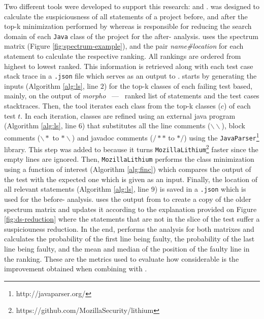 \documentclass[sigplan,10pt,review,anonymous]{acmart}\settopmatter{printfolios=true,printccs=false,printacmref=false}
\begin{document}
Two different tools were developed to support this research: \morpho{} and \lithium{}. \morpho{} was designed to calculate the suspiciousness of all statements of a project before, and after the top-k minimization performed by \lithium{} whereas \lithium{} is responsible for reducing the search domain of each \texttt{Java} class of the project for the after-\sfl{} analysis. \morpho{} uses the spectrum matrix (Figure \ref{fig:spectrum-example}), and the pair \emph{name\#location} for each statement to calculate the respective ranking. All rankings are ordered from highest to lowest ranked. This information is retrieved along with each test case stack trace in a \texttt{.json} file which serves as an output to \lithium{}. \lithium{} starts by generating the inputs (Algorithm \ref{alg:ls}, line $2$) for the top-k classes of each failing test based, mainly, on the output of \emph{morpho} ~---~ ranked list of statements and the test cases stacktraces. Then, the tool iterates each class from the top-k classes ($c$) of each test $t$. In each iteration, classes are refined using an external java program (Algorithm \ref{alg:ls}, line 6) that substitutes all the line comments ($\backslash\backslash$), block comments ($\backslash*$ to $*\backslash$) and javadoc comments ($/**$ to $*/$) using the \texttt{JavaParser}\footnote{http://javaparser.org/} library. This step was added to \lithium{} because it turns \texttt{MozillaLithium}\footnote{https://github.com/MozillaSecurity/lithium} faster since the empty lines are ignored. Then, \texttt{MozillaLithium} performs the class minimization using a function of interest (Algorithm \ref{alg:finc}) which compares the output of the test with the expected one which is given as an input. Finally, the location of all relevant statements (Algorithm \ref{alg:ls}, line 9) is saved in a \texttt{.json} which is used for the before-\sfl{} analysis. \morpho{} uses the output from \lithium{} to create a copy of the older spectrum matrix and updates it according to the explanation provided on Figure \ref{fig:ds-reduction} where the statements that are not in the slice of the test suffer a suspiciouness reduction. In the end, \morpho{} performs the \sfl{} analysis for both matrixes and calculates the probability of the first line being faulty, the probability of the last line being faulty, and the mean and median of the position of the faulty line in the ranking. These are the metrics used to evaluate how considerable is the improvement obtained when combining \ds{} with \sfl{}.
\end{document}
